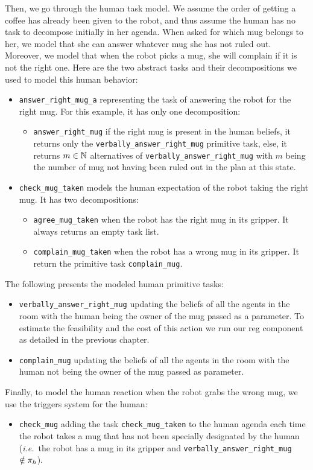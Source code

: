 \documentclass[a4paper,11pt,twoside]{StyleThese}
\begin{document}
Then, we go through the human task model. We assume the order of getting a coffee has already been given to the robot, and thus assume the human has no task to decompose initially in her agenda. When asked for which mug belongs to her, we model that she can answer whatever mug she has not ruled out. Moreover, we model that when the robot picks a mug, she will complain if it is not the right one. Here are the two abstract tasks and their decompositions we used to model this human behavior:
\begin{itemize}
\item \verb'answer_right_mug_a' representing the task of answering the robot for the right mug. For this example, it has only one decomposition:
	\begin{itemize}
	\item \verb'answer_right_mug' if the right mug is present in the human beliefs, it returns only the \verb'verbally_answer_right_mug' primitive task, else, it returns $m \in \mathbb{N}$ alternatives of \verb'verbally_answer_right_mug' with $m$ being the number of mug not having been ruled out in the plan at this state.
	\end{itemize}
\item \verb'check_mug_taken' models the human expectation of the robot taking the right mug. It has two decompositions:
	\begin{itemize}
	\item \verb'agree_mug_taken' when the robot has the right mug in its gripper. It always returns an empty task list.
	\item \verb'complain_mug_taken' when the robot has a wrong mug in its gripper. It return the primitive task \verb'complain_mug'.
	\end{itemize}
\end{itemize}
The following presents the modeled human primitive tasks:
\begin{itemize}
\item \verb'verbally_answer_right_mug' updating the beliefs of all the agents in the room with the human being the owner of the mug passed as a parameter. To estimate the feasibility and the cost of this action we run our \acrshort{reg} component as detailed in the previous chapter. 
\item \verb'complain_mug' updating the beliefs of all the agents in the room with the human not being the owner of the mug passed as parameter.
\end{itemize}
Finally, to model the human reaction when the robot grabs the wrong mug, we use the triggers system for the human:
\begin{itemize}
\item \verb'check_mug' adding the task \verb'check_mug_taken' to the human agenda each time the robot takes a mug that has not been specially designated by the human (\textit{i.e.}~the robot has a mug in its gripper and \verb'verbally_answer_right_mug'~$\notin \pi_h$).
\end{itemize}
\end{document}
